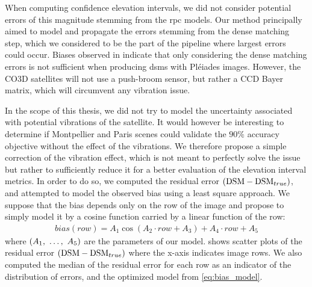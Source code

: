 When computing confidence elevation intervals, we did not consider potential errors of this magnitude stemming from the \acrshort{rpc} models. Our method principally aimed to model and propagate the errors stemming from the dense matching step, which we considered to be the part of the pipeline where largest errors could occur. Biases observed in  indicate that only considering the dense matching errors is not sufficient when producing \acrshort{dsm}s with Pléiades images. However, the CO3D satellites will not use a push-broom sensor, but rather a CCD Bayer matrix, which will circumvent any vibration issue.

In the scope of this thesis, we did not try to model the uncertainty associated with potential vibrations of the satellite. It would however be interesting to determine if Montpellier and Paris scenes could validate the $90\%$ accuracy objective without the effect of the vibrations. We therefore propose a simple correction of the vibration effect, which is not meant to perfectly solve the issue but rather to sufficiently reduce it for a better evaluation of the elevation interval metrics. In order to do so, we computed the residual error $(\mathrm{DSM}-\mathrm{DSM}_{true})$, and attempted to model the observed bias using a least square approach. We suppose that the bias depends only on the row of the image and propose to simply model it by a cosine function carried by a linear function of the row:
\begin{align}\label{eq:bias_model}
    bias(row)=A_1\cos(A_2\cdot row+A_3) + A_4\cdot row+A_5
\end{align}
where $(A_1, ~\dots, ~ A_5)$ are the parameters of our model.  shows scatter plots of the residual error $(\mathrm{DSM}-\mathrm{DSM}_{true})$ where the x-axis indicates image rows. We also computed the median of the residual error for each row as an indicator of the distribution of errors, and the optimized model from \cref{eq:bias_model}.

